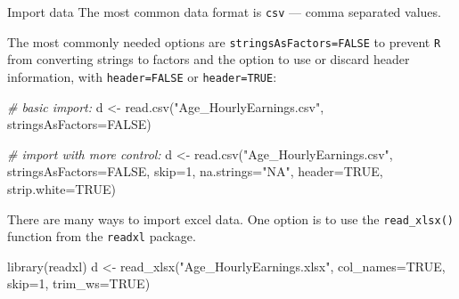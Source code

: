\documentclass[
  11pt,
  ignorenonframetext,
  svgnames, handout, t]{beamer}
\newenvironment{Shaded}{\begin{snugshade}}{\end{snugshade}}
\newcommand{\AttributeTok}[1]{\textcolor[rgb]{0.77,0.63,0.00}{#1}}
\newcommand{\CommentTok}[1]{\textcolor[rgb]{0.56,0.35,0.01}{\textit{#1}}}
\newcommand{\ConstantTok}[1]{\textcolor[rgb]{0.00,0.00,0.00}{#1}}
\newcommand{\DecValTok}[1]{\textcolor[rgb]{0.00,0.00,0.81}{#1}}
\newcommand{\FunctionTok}[1]{\textcolor[rgb]{0.00,0.00,0.00}{#1}}
\newcommand{\NormalTok}[1]{#1}
\newcommand{\OtherTok}[1]{\textcolor[rgb]{0.56,0.35,0.01}{#1}}
\newcommand{\StringTok}[1]{\textcolor[rgb]{0.31,0.60,0.02}{#1}}
\begin{document}
\begin{frame}[fragile]{Import data}
\protect\hypertarget{import-data}{}
The most common data format is \texttt{csv} --- comma separated values.

The most commonly needed options are \texttt{stringsAsFactors=FALSE} to
prevent \texttt{R} from converting strings to factors and the option to
use or discard header information, with \texttt{header=FALSE} or
\texttt{header=TRUE}:

\footnotesize

\begin{Shaded}
\begin{Highlighting}[]
\CommentTok{\# basic import:}
\NormalTok{d }\OtherTok{\textless{}{-}} \FunctionTok{read.csv}\NormalTok{(}\StringTok{"Age\_HourlyEarnings.csv"}\NormalTok{, }\AttributeTok{stringsAsFactors=}\ConstantTok{FALSE}\NormalTok{)}

\CommentTok{\# import with more control:}
\NormalTok{d }\OtherTok{\textless{}{-}} \FunctionTok{read.csv}\NormalTok{(}\StringTok{"Age\_HourlyEarnings.csv"}\NormalTok{, }\AttributeTok{stringsAsFactors=}\ConstantTok{FALSE}\NormalTok{, }
              \AttributeTok{skip=}\DecValTok{1}\NormalTok{, }\AttributeTok{na.strings=}\StringTok{"NA"}\NormalTok{, }\AttributeTok{header=}\ConstantTok{TRUE}\NormalTok{, }\AttributeTok{strip.white=}\ConstantTok{TRUE}\NormalTok{)}
\end{Highlighting}
\end{Shaded}

\normalsize

There are many ways to import excel data. One option is to use the
\texttt{read\_xlsx()} function from the \texttt{readxl} package.

\footnotesize

\begin{Shaded}
\begin{Highlighting}[]
\FunctionTok{library}\NormalTok{(readxl)}
\NormalTok{d }\OtherTok{\textless{}{-}} \FunctionTok{read\_xlsx}\NormalTok{(}\StringTok{"Age\_HourlyEarnings.xlsx"}\NormalTok{, }\AttributeTok{col\_names=}\ConstantTok{TRUE}\NormalTok{, }\AttributeTok{skip=}\DecValTok{1}\NormalTok{, }\AttributeTok{trim\_ws=}\ConstantTok{TRUE}\NormalTok{)}
\end{Highlighting}
\end{Shaded}

\normalsize
\end{frame}
\end{document}
